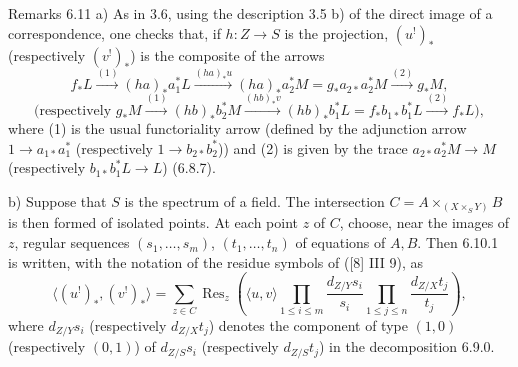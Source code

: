 \begin{statement}{Remarks 6.11}
a) As in 3.6, using the description 3.5 b) of the direct image of a correspondence, one checks that, if $h:Z\to S$ is the projection, $(u^!)_*$ (respectively $(v^!)_*$) is the composite of the arrows
\[
f_*L\xrightarrow{(1)}(ha)_*a_1^*L\xrightarrow{(ha)_*u}(ha)_*a_2^*M=g_*a_{2*}a_2^*M\xrightarrow{(2)}g_*M,
\]
\[
\text{(respectively }g_*M\xrightarrow{(1)}(hb)_*b_2^*M\xrightarrow{(hb)_*v}(hb)_*b_1^*L=f_*b_{1*}b_1^*L\xrightarrow{(2)}f_*L\text{)},
\]
where (1) is the usual functoriality arrow (defined by the adjunction arrow $1\to a_{1*}a_1^*$ (respectively $1\to b_{2*}b_2^*$)) and (2) is given by the trace $a_{2*}a_2^*M\to M$ (respectively $b_{1*}b_1^*L\to L$) (6.8.7).

b) Suppose that $S$ is the spectrum of a field. The intersection $C=A\times_{(X\times_S Y)}B$ is then formed of isolated points. At each point $z$ of $C$, choose, near the images of $z$, regular sequences $(s_1,\ldots,s_m)$, $(t_1,\ldots,t_n)$ of equations of $A,B$. Then 6.10.1 is written, with the notation of the residue symbols of ([8] III 9), as
\begin{equation}
\tag{6.11.1}
\langle (u^!)_*,(v^!)_*\rangle=
\sum_{z\in C}\operatorname{Res}_z\left(\langle u,v\rangle
\prod_{1\le i\le m}\frac{d_{Z/Y}s_i}{s_i}
\prod_{1\le j\le n}\frac{d_{Z/X}t_j}{t_j}\right),
\end{equation}
where $d_{Z/Y}s_i$ (respectively $d_{Z/X}t_j$) denotes the component of type $(1,0)$ (respectively $(0,1)$) of $d_{Z/S}s_i$ (respectively $d_{Z/S}t_j$) in the decomposition 6.9.0.
\end{statement}

